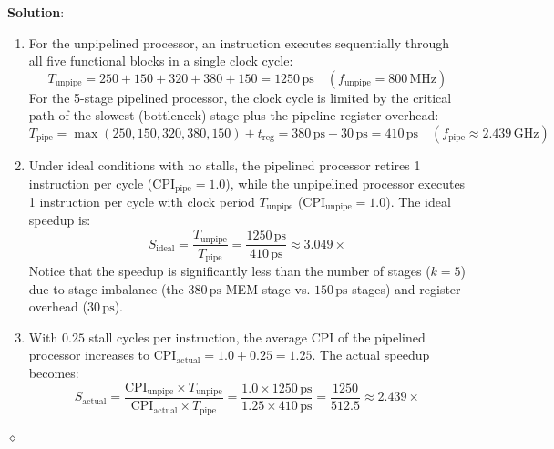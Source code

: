 \begin{problem}
\textbf{Solution}:
\begin{enumerate}
    \item For the unpipelined processor, an instruction executes sequentially through all five functional blocks in a single clock cycle:
    \[
    T_{\text{unpipe}} = 250 + 150 + 320 + 380 + 150 = 1250\,\text{ps} \quad (f_{\text{unpipe}} = 800\,\text{MHz})
    \]
    For the 5-stage pipelined processor, the clock cycle is limited by the critical path of the slowest (bottleneck) stage plus the pipeline register overhead:
    \[
    T_{\text{pipe}} = \max(250, 150, 320, 380, 150) + t_{\text{reg}} = 380\,\text{ps} + 30\,\text{ps} = 410\,\text{ps} \quad (f_{\text{pipe}} \approx 2.439\,\text{GHz})
    \]
    \item Under ideal conditions with no stalls, the pipelined processor retires 1 instruction per cycle ($\text{CPI}_{\text{pipe}} = 1.0$), while the unpipelined processor executes 1 instruction per cycle with clock period $T_{\text{unpipe}}$ ($\text{CPI}_{\text{unpipe}} = 1.0$). The ideal speedup is:
    \[
    S_{\text{ideal}} = \frac{T_{\text{unpipe}}}{T_{\text{pipe}}} = \frac{1250\,\text{ps}}{410\,\text{ps}} \approx 3.049\times
    \]
    Notice that the speedup is significantly less than the number of stages ($k = 5$) due to stage imbalance (the $380\,\text{ps}$ MEM stage vs. $150\,\text{ps}$ stages) and register overhead ($30\,\text{ps}$).
    \item With $0.25$ stall cycles per instruction, the average CPI of the pipelined processor increases to $\text{CPI}_{\text{actual}} = 1.0 + 0.25 = 1.25$. The actual speedup becomes:
    \[
    S_{\text{actual}} = \frac{\text{CPI}_{\text{unpipe}} \times T_{\text{unpipe}}}{\text{CPI}_{\text{actual}} \times T_{\text{pipe}}} = \frac{1.0 \times 1250\,\text{ps}}{1.25 \times 410\,\text{ps}} = \frac{1250}{512.5} \approx 2.439\times
    \]
\end{enumerate}
$\diamond$
\end{problem}

